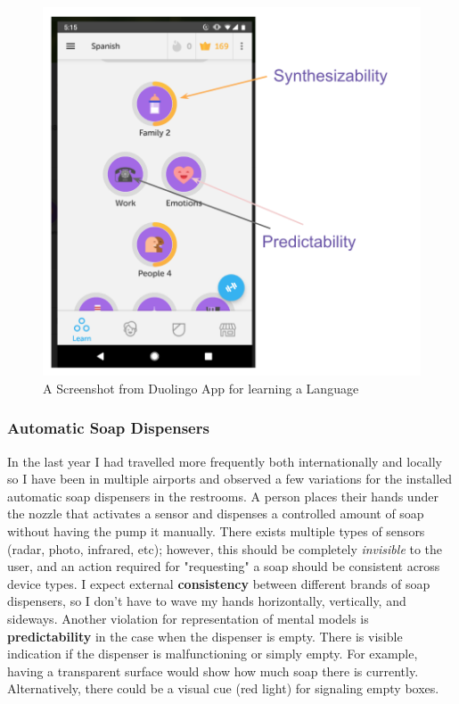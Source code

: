 \documentclass[12pt,letterpaper]{article}
\begin{document}
\begin{figure}[h]
\centering
\includegraphics[scale=.6]{figures/p3/duolingvo.png}
\caption{A Screenshot from Duolingo App for learning a Language}
\label{fig::3}
\end{figure}

\subsubsection*{Automatic Soap Dispensers}
In the last year I had travelled more frequently both internationally and locally so I have been in multiple airports and observed a few variations for the installed automatic soap dispensers in the restrooms. A person places their hands under the nozzle that activates a sensor and dispenses a controlled amount of soap without having the pump it manually. There exists multiple types of sensors (radar, photo, infrared, etc); however, this should be completely  \textit{invisible} to the user, and an action required for "requesting" a soap should be consistent across device types. I expect external \textbf{consistency} between different brands of soap dispensers, so I don't have to wave my hands horizontally, vertically, and sideways. Another violation for representation of mental models is \textbf{predictability} in the case when the dispenser is empty. There is visible indication if the dispenser is malfunctioning or simply empty. For example, having a transparent surface would show how much soap there is currently. Alternatively, there could be a visual cue (red light) for signaling empty boxes.

 

\end{document}
